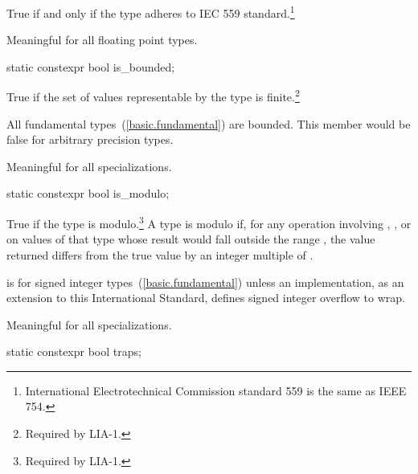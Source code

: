 \begin{itemdescr}
\pnum
True if and only if the type adheres to IEC 559 standard.\footnote{International
Electrotechnical Commission standard 559 is the same as
IEEE 754.}

\pnum
Meaningful for all floating point types.
\end{itemdescr}

\begin{itemdecl}
static constexpr bool is_bounded;
\end{itemdecl}

\begin{itemdescr}
\pnum
True if the set of values representable by the type is finite.\footnote{Required by LIA-1.}
\begin{note} All fundamental types~(\ref{basic.fundamental}) are bounded. This member would be false for arbitrary
precision types.\end{note}

\pnum
Meaningful for all specializations.
\end{itemdescr}

\begin{itemdecl}
static constexpr bool is_modulo;
\end{itemdecl}

\begin{itemdescr}
\pnum
True if the type is modulo.\footnote{Required by LIA-1.}
A type is modulo if, for any operation involving \tcode{+}, \tcode{-}, or
\tcode{*} on values of that type whose result would fall outside the range
, the value returned differs from the true value by an
integer multiple of .

\pnum
\begin{example}
 is  for signed integer types~(\ref{basic.fundamental})
unless an implementation, as an extension to this International Standard,
defines signed integer overflow to wrap.
\end{example}

\pnum
Meaningful for all specializations.
\end{itemdescr}

\begin{itemdecl}
static constexpr bool traps;
\end{itemdecl}

